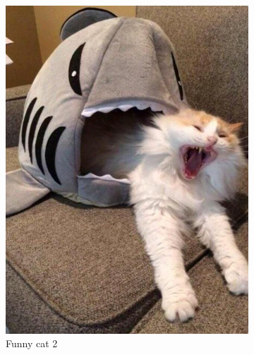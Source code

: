 \documentclass{article}
\begin{document}
    \begin{figure}[h!]
        \centering
        \begin{subfigure}[b]{0.4\linewidth}
            \includegraphics[width=\linewidth]{cat2.jpg}
            \caption{Funny cat 2}
        \end{subfigure}
        \begin{subfigure}[b]{0.4\linewidth}

\end{subfigure}
\end{figure}
\end{document}
